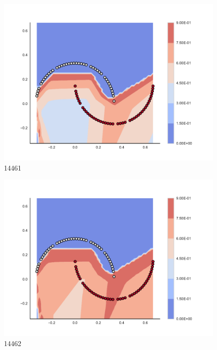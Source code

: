 \begin{subfigure}[b]{0.09\textwidth}
    \includegraphics[clip, trim=2.35cm 1.75cm 4.5cm 0cm,width=\textwidth]{img/convergence/14461.pdf}
    \caption{14461}
    \label{fig:convergence_14461}
\end{subfigure}
%
\begin{subfigure}[b]{0.09\textwidth}
    \includegraphics[clip, trim=2.35cm 1.75cm 4.5cm 0cm,width=\textwidth]{img/convergence/14462.pdf}
    \caption{14462}
    \label{fig:convergence_14462}
\end{subfigure}
%
